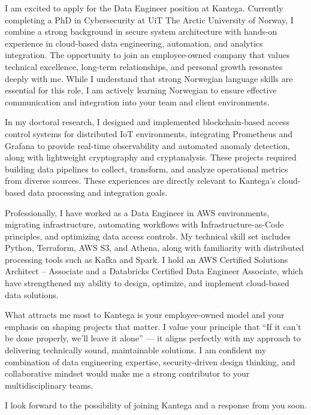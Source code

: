I am excited to apply for the Data Engineer position at Kantega. Currently completing a PhD in Cybersecurity at UiT The Arctic University of Norway, I combine a strong background in secure system architecture with hands-on experience in cloud-based data engineering, automation, and analytics integration. The opportunity to join an employee-owned company that values technical excellence, long-term relationships, and personal growth resonates deeply with me. While I understand that strong Norwegian language skills are essential for this role, I am actively learning Norwegian to ensure effective communication and integration into your team and client environments.

In my doctoral research, I designed and implemented blockchain-based access control systems for distributed IoT environments, integrating Prometheus and Grafana to provide real-time observability and automated anomaly detection, along with lightweight cryptography and cryptanalysis. These projects required building data pipelines to collect, transform, and analyze operational metrics from diverse sources. These experiences are directly relevant to Kantega’s cloud-based data processing and integration goals.

Professionally, I have worked as a Data Engineer in AWS environments, migrating infrastructure, automating workflows with Infrastructure-as-Code principles, and optimizing data access controls. My technical skill set includes Python, Terraform, AWS S3, and Athena, along with familiarity with distributed processing tools such as Kafka and Spark. I hold an AWS Certified Solutions Architect – Associate and a Databricks Certified Data Engineer Associate, which have strengthened my ability to design, optimize, and implement cloud-based data solutions.

What attracts me most to Kantega is your employee-owned model and your emphasis on shaping projects that matter. I value your principle that “If it can’t be done properly, we’ll leave it alone” — it aligns perfectly with my approach to delivering technically sound, maintainable solutions. I am confident my combination of data engineering expertise, security-driven design thinking, and collaborative mindset would make me a strong contributor to your multidisciplinary teams.

I look forward to the possibility of joining Kantega and a response from you soon. 
